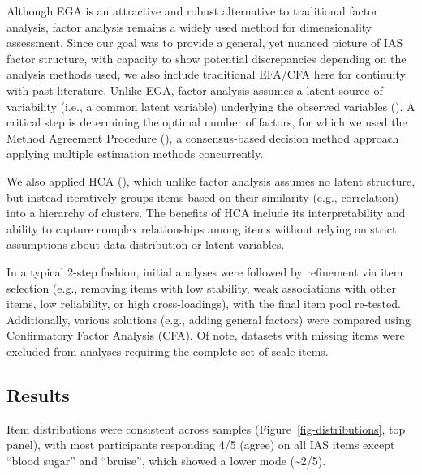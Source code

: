 \documentclass[
  jou,
  floatsintext,
  longtable,
  nolmodern,
  notxfonts,
  notimes,
  colorlinks=true,linkcolor=blue,citecolor=blue,urlcolor=blue]{apa7}
\begin{document}
Although EGA is an attractive and robust alternative to traditional
factor analysis, factor analysis remains a widely used method for
dimensionality assessment. Since our goal was to provide a general, yet
nuanced picture of IAS factor structure, with capacity to show potential
discrepancies depending on the analysis methods used, we also include
traditional EFA/CFA here for continuity with past literature. Unlike
EGA, factor analysis assumes a latent source of variability (i.e., a
common latent variable) underlying the observed variables
(). A
critical step is determining the optimal number of factors, for which we
used the Method Agreement Procedure
(), a
consensus-based decision method approach applying multiple estimation
methods concurrently.

We also applied HCA (), which unlike factor analysis assumes no latent structure, but
instead iteratively groups items based on their similarity (e.g.,
correlation) into a hierarchy of clusters. The benefits of HCA include
its interpretability and ability to capture complex relationships among
items without relying on strict assumptions about data distribution or
latent variables.

In a typical 2-step fashion, initial analyses were followed by
refinement via item selection (e.g., removing items with low stability,
weak associations with other items, low reliability, or high
cross-loadings), with the final item pool re-tested. Additionally,
various solutions (e.g., adding general factors) were compared using
Confirmatory Factor Analysis (CFA). Of note, datasets with missing items
were excluded from analyses requiring the complete set of scale items.

\subsection{Results}\label{results}

Item distributions were consistent across samples
(Figure~\ref{fig-distributions}, top panel), with most participants
responding 4/5 (agree) on all IAS items except ``blood sugar'' and
``bruise'', which showed a lower mode (\textasciitilde2/5).
\end{document}
